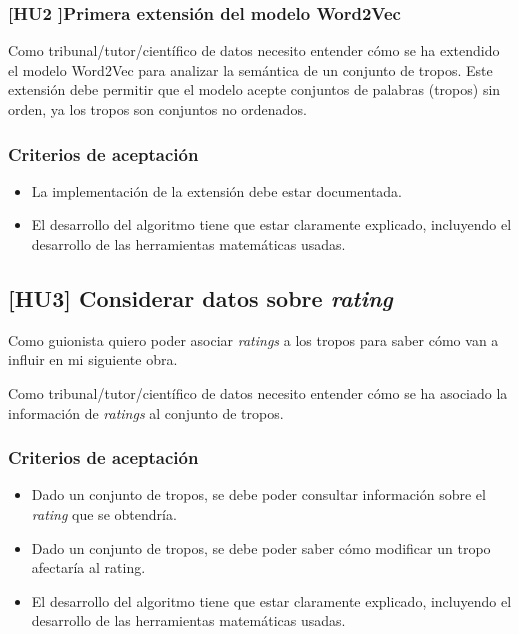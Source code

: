 \subsubsection{[HU2 ]Primera extensión del modelo Word2Vec}\label{uc:word2vec_primera_extension}

Como tribunal/tutor/científico de datos
necesito entender cómo se ha extendido el modelo Word2Vec para analizar la semántica de un conjunto de
tropos. Este extensión debe permitir que el modelo acepte conjuntos de palabras (tropos) sin orden, ya
los tropos son conjuntos no ordenados.

\subsubsection{Criterios de aceptación}

\begin{itemize}
      \item La implementación de la extensión debe estar documentada.
      \item El desarrollo del algoritmo tiene que estar claramente explicado, incluyendo el desarrollo de las herramientas matemáticas usadas.
\end{itemize}

\subsection{[HU3] Considerar datos sobre \textit{rating}}\label{uc:word2vec_rating}

Como guionista quiero poder asociar \textit{ratings} a los tropos para saber cómo van
a influir en mi siguiente obra.

Como tribunal/tutor/científico de datos necesito entender cómo se ha asociado la información
de \textit{ratings} al conjunto de tropos.

\subsubsection{Criterios de aceptación}

\begin{itemize}
      \item Dado un conjunto de tropos, se debe poder consultar información sobre el \textit{rating} que se obtendría.
      \item Dado un conjunto de tropos, se debe poder saber cómo modificar un tropo afectaría al rating.
      \item El desarrollo del algoritmo tiene que estar claramente explicado, incluyendo el desarrollo de las herramientas matemáticas usadas.
\end{itemize}

